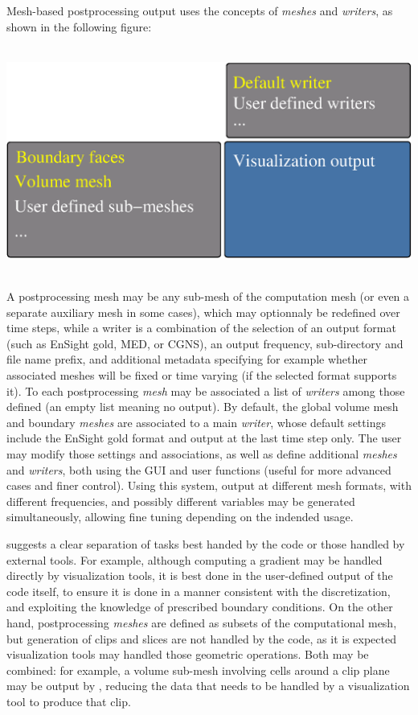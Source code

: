 Mesh-based postprocessing output uses the concepts of \emph{meshes}
and \emph{writers}, as shown in the following figure:

~\
\includegraphics[scale=0.3]{pictures/cs_post.eps}
\label{fig:cs_post}
\vspace{+0.04in}
~\

A postprocessing mesh may be any sub-mesh of the computation mesh (or even
a separate auxiliary mesh in some cases), which may optionnaly
be redefined over time steps, while a writer is a combination of the
selection of an output format (such as EnSight gold, MED, or CGNS),
an output frequency, sub-directory and file name prefix,
and additional metadata specifying for example whether associated meshes
will be fixed or time varying (if the selected format supports it).
To each postprocessing \emph{mesh} may be associated a list of
\emph{writers} among those defined (an empty list meaning no output).
By default, the global volume mesh and boundary \emph{meshes} are
associated to a main \emph{writer}, whose default settings include the
EnSight gold format and output at the last time step only.
The user may modify those settings and associations, as well as
define additional \emph{meshes} and \emph{writers}, both using
the GUI and user functions (useful for more advanced cases
and finer control).
Using this system, output at different mesh formats, with different
frequencies, and possibly different variables may be generated
simultaneously, allowing fine tuning depending on the indended
usage.

\CS suggests a clear separation of tasks best handed by the code
or those handled by external tools. For example, although computing
a gradient may be handled directly by visualization tools, it is
best done in the user-defined output of the code itself, to ensure
it is done in a manner consistent with the discretization, and
exploiting the knowledge of prescribed boundary conditions.
On the other hand, postprocessing \emph{meshes} are defined as
subsets of the computational mesh, but generation of clips and slices
are not handled by the code, as it is expected visualization tools
may handled those geometric operations. Both may be combined: for example,
a volume sub-mesh involving cells around a clip plane may be output
by \CS, reducing the data that needs to be handled by a visualization
tool to produce that clip.

